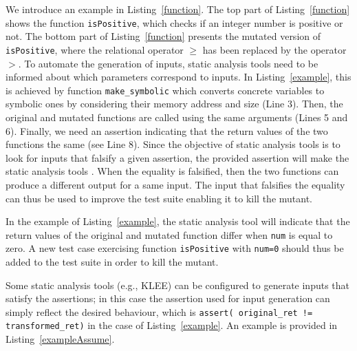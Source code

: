We introduce an example in Listing~\ref{function}. The top part of Listing~\ref{function} shows the function \texttt{isPositive}, which checks if an integer number is positive or not. The bottom part of Listing~\ref{function} presents the mutated version of \texttt{isPositive}, where the relational operator $\geq$ has been replaced by the operator $>$.
To automate the generation of inputs, static analysis tools need to be informed about which parameters correspond to inputs. 
In Listing~\ref{example}, this is achieved by function \texttt{make\_symbolic} which converts concrete variables to symbolic ones by considering their memory address and size (Line 3). 
Then, the original and mutated functions are called using the same arguments (Lines 5 and 6).
Finally, we need an assertion indicating that the return values of the two functions the same (see Line 8).
Since the objective of static analysis tools is to look for inputs that falsify a given assertion, the provided assertion
will make the static analysis tools . 
When the equality is falsified, then the two functions can produce a different output for a same input.
The input that falsifies the equality can thus be used to improve the test suite enabling it to kill the mutant.


In the example of Listing~\ref{example}, the static analysis tool will indicate that the return values of the original and mutated function differ when \texttt{num} is equal to zero.
A new test case exercising function \texttt{isPositive} with \texttt{num=0} should thus be added to the test suite in order to kill the mutant.

Some static analysis tools (e.g., KLEE) can be configured to generate inputs that satisfy the assertions; in this case the assertion used for input generation can simply reflect the desired behaviour, which is \texttt{assert( original\_ret != transformed\_ret)} in the case of Listing~\ref{example}. An example is provided in Listing~\ref{exampleAssume}.

